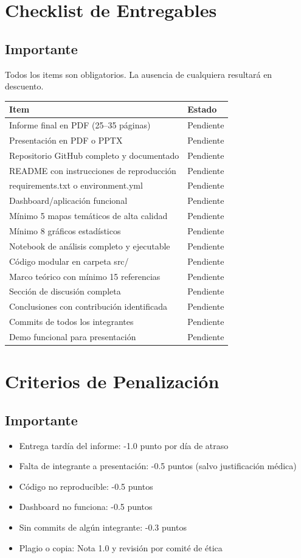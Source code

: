 \documentclass[11pt,a4paper]{article}
\begin{document}
\section{Checklist de Entregables}
\subsection*{Importante}
Todos los items son obligatorios. La ausencia de cualquiera resultará en descuento.
\begin{center}
\begin{tabular}{p{} p{}}
\toprule
\textbf{Item} & \textbf{Estado}\\
\midrule
Informe final en PDF (25--35 páginas) & Pendiente\\
Presentación en PDF o PPTX & Pendiente\\
Repositorio GitHub completo y documentado & Pendiente\\
README con instrucciones de reproducción & Pendiente\\
requirements.txt o environment.yml & Pendiente\\
Dashboard/aplicación funcional & Pendiente\\
Mínimo 5 mapas temáticos de alta calidad & Pendiente\\
Mínimo 8 gráficos estadísticos & Pendiente\\
Notebook de análisis completo y ejecutable & Pendiente\\
Código modular en carpeta src/ & Pendiente\\
Marco teórico con mínimo 15 referencias & Pendiente\\
Sección de discusión completa & Pendiente\\
Conclusiones con contribución identificada & Pendiente\\
Commits de todos los integrantes & Pendiente\\
Demo funcional para presentación & Pendiente\\
\bottomrule
\end{tabular}
\end{center}

\section{Criterios de Penalización}
\subsection*{Importante}
\begin{itemize}[leftmargin=*]
\item Entrega tardía del informe: -1.0 punto por día de atraso
\item Falta de integrante a presentación: -0.5 puntos (salvo justificación médica)
\item Código no reproducible: -0.5 puntos
\item Dashboard no funciona: -0.5 puntos
\item Sin commits de algún integrante: -0.3 puntos
\item Plagio o copia: Nota 1.0 y revisión por comité de ética
\end{itemize}
\end{document}
